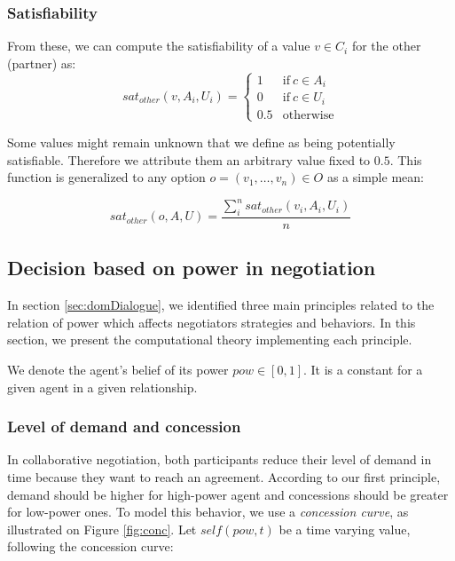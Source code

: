 \documentclass{llncs}
\begin{document}
		\subsubsection*{Satisfiability}
		 From these, we can compute the satisfiability of a value $v\in C_i$ for the other (partner) as:
		\vspace{-0.5em} 
		\begin{equation}
		sat_{other}(v, A_i, U_i)= \left\{\begin{array}{ll}
		1	 & \mathrm{if\ }  c \in A_i\\
		0    & \mathrm{if\ }c \in U_i\\
		0.5	 & \mathrm{otherwise}
		\end{array}\right.
		\end{equation}
		
		Some values might remain unknown that we define as being potentially satisfiable. Therefore we attribute them an arbitrary value fixed to $0.5$. This function is generalized to any option $o=(v_1,\ldots,v_n) \in O$ as a simple mean:
		
		\begin{equation}
		sat_{other}(o, A, U) = \frac{ \sum_{i}^{n} sat_{other}(v_i, A_i, U_i) } {n}
		\end{equation}
		
		
		
		\subsection{Decision based on power in negotiation}
		\label{sec:decision}
		
		
		In section \ref{sec:domDialogue}, we identified three main principles related to the relation of power which affects negotiators strategies and behaviors. In this section, we present the computational theory implementing each principle. 
		
		We denote the agent's belief of its  power $pow \in [0, 1] $. It is a constant for a given agent in a given relationship.
		
		
		\subsubsection{Level of demand and concession}
	
		
		In collaborative negotiation, both participants reduce their level of demand in time because they want to reach an agreement.
		According to our first principle, demand should be higher for high-power agent and concessions should be greater for low-power ones. To model this behavior, we use a \emph{concession curve}, as illustrated on Figure \ref{fig:conc}. 
		Let $self(pow, t)$ be a time varying value, following the concession curve:
		
\end{document}
